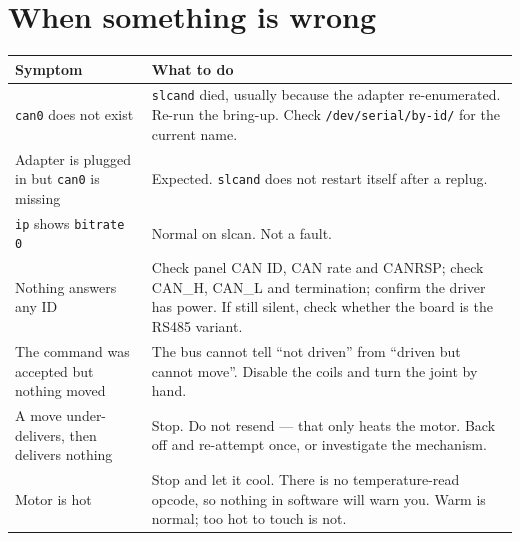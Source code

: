 \documentclass[11pt,letterpaper]{article}
\begin{document}
\section{When something is wrong}

\begin{longtable}{p{}p{}}
\toprule
\textbf{Symptom} & \textbf{What to do} \\ \midrule
\endhead
\texttt{can0} does not exist &
  \texttt{slcand} died, usually because the adapter re-enumerated. Re-run the
  bring-up. Check \texttt{/dev/serial/by-id/} for the current name. \\
Adapter is plugged in but \texttt{can0} is missing &
  Expected. \texttt{slcand} does not restart itself after a replug. \\
\texttt{ip} shows \texttt{bitrate 0} &
  Normal on slcan. Not a fault. \\
Nothing answers any ID &
  Check panel CAN ID, CAN rate and CANRSP; check CAN\_H, CAN\_L and termination;
  confirm the driver has power. If still silent, check whether the board is the
  RS485 variant. \\
The command was accepted but nothing moved &
  The bus cannot tell ``not driven'' from ``driven but cannot move''. Disable the
  coils and turn the joint by hand. \\
A move under-delivers, then delivers nothing &
  Stop. Do not resend --- that only heats the motor. Back off and re-attempt once,
  or investigate the mechanism. \\
Motor is hot &
  Stop and let it cool. There is no temperature-read opcode, so nothing in software
  will warn you. Warm is normal; too hot to touch is not. \\
\bottomrule
\end{longtable}
\end{document}
